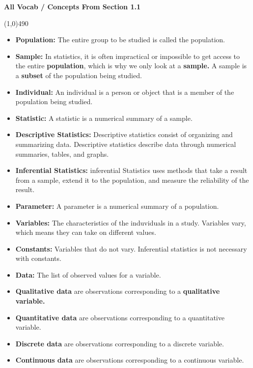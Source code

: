 \documentclass{report}
\begin{document}
        \pagebreak \bigbreak \noindent
        \begin{center}
            \begin{large}
                \textbf{All Vocab / Concepts From Section 1.1}
            \end{large}
        \end{center}
        \line(1,0){490}
        \begin{itemize}
            \item \textbf{Population:} The entire group to be studied is called the population.
            \item \textbf{Sample:} In statistics, it is often impractical or impossible to get access to the entire \textbf{population}, which is why we only look at a \textbf{sample.} A sample is a \textbf{subset} of the population being studied.
            \item \textbf{Individual:} An individual is a person or object that is a member of the population being studied.
            \item \textbf{Statistic:} A statistic is a numerical summary of a sample.
            \item \textbf{Descriptive Statistics:} Descriptive statistics consist of organizing and summarizing data. Descriptive statistics describe data through numerical summaries, tables, and graphs.
            \item \textbf{Inferential Statistics:} inferential Statistics uses methods that take a result from a sample, extend it to the population, and measure the reliability of the result.
            \item \textbf{Parameter:} A parameter is a numerical summary of a population.
            \item \textbf{Variables:} The characteristics of the induviduals in a study. Variables vary, which means they can take on different values.
            \item \textbf{Constants:} Variables that do not vary. Inferential statistics is not necessary with constants.
            \item \textbf{Data:} The list of observed values for a variable.
            \item \textbf{Qualitative data} are observations corresponding to a \textbf{qualitative variable.}
            \item \textbf{Quantitative data} are observations corresponding to a quantitative variable.
            \item \textbf{Discrete data} are observations corresponding to a discrete variable.
            \item \textbf{Continuous data} are observations corresponding to a continuous variable.
        \end{itemize}
\end{document}
